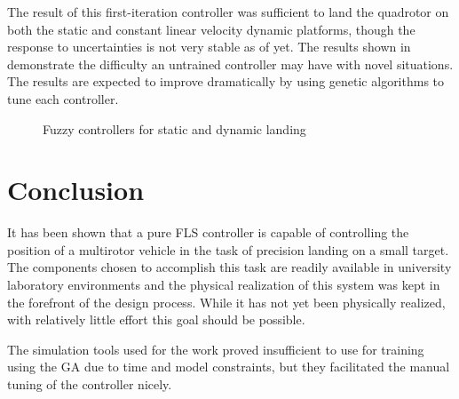 The result of this first-iteration controller was sufficient to land the quadrotor on both the static and
constant linear velocity dynamic platforms, though the response to uncertainties is not very stable as of yet.
The results shown in  demonstrate the difficulty an untrained controller may
have with novel situations. The results are expected to improve dramatically by using genetic algorithms to
tune each controller.
\begin{figure}[ht]
    \begin{subfigmatrix}{2}
    \end{subfigmatrix}
    \caption{Fuzzy controllers for static and dynamic landing}\label{f:fuzzy_lands}
\end{figure}


\section{Conclusion}
It has been shown that a pure FLS controller is capable of controlling the position of a multirotor vehicle in
the task of precision landing on a small target. The components chosen to accomplish this task are readily
available in university laboratory environments and the physical realization of this system was kept in the
forefront of the design process. While it has not yet been physically realized, with relatively little effort
this goal should be possible. 

The simulation tools used for the work proved insufficient to use for training using the GA due to time and
model constraints, but they facilitated the manual tuning of the controller nicely. 

